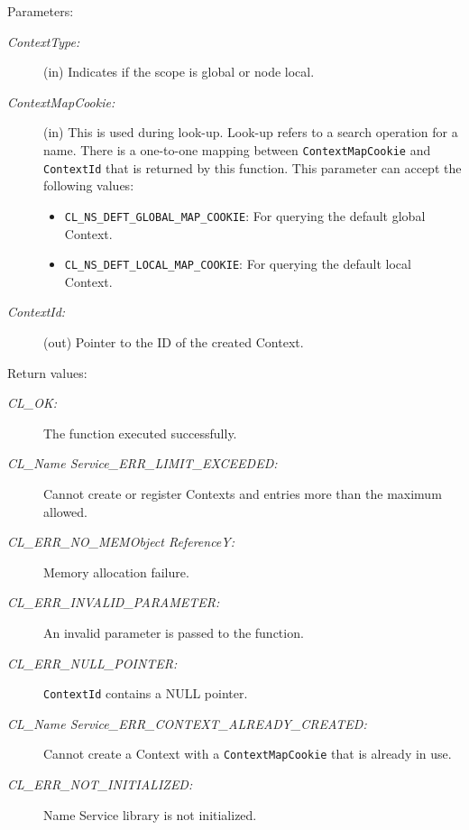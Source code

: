 \begin{flushleft}
\begin{Desc}
\begin{verbatim}
\end{verbatim}
\normalsize
\end{Desc}
\begin{Desc}
\item[Parameters:]
\begin{description}
\item[{\em Context\-Type:}](in) Indicates if the scope is global or node local. 
\item[{\em Context\-Map\-Cookie:}](in) This is used during look-up. Look-up refers to a search operation for a name. There is a one-to-one mapping 
between {\tt{ContextMapCookie}} and {\tt{ContextId}} that is returned by this function.
This parameter can 
accept the following values: 
\begin{itemize}
\item
{\tt{CL\_\-NS\_\-DEFT\_\-GLOBAL\_\-MAP\_\-COOKIE}}: For querying the default global Context. 
\item
{\tt{CL\_\-NS\_\-DEFT\_\-LOCAL\_\-MAP\_\-COOKIE}}: For querying the default local Context.  
\end{itemize}
\item[{\em Context\-Id:}](out) Pointer to the ID of the created Context.\end{description}
\end{Desc}
\begin{Desc}
\item[Return values:]
\begin{description}
\item[{\em CL\_\-OK:}]The function executed successfully. 
\item[{\em CL\_\-Name Service\_\-ERR\_\-LIMIT\_\-EXCEEDED:}]Cannot create or register Contexts and entries more than the maximum allowed.
\item[{\em CL\_\-ERR\_\-NO\_\-MEMObject ReferenceY:}]Memory allocation failure. 
\item[{\em CL\_\-ERR\_\-INVALID\_\-PARAMETER:}]An invalid parameter is passed to the function. 
\item[{\em CL\_\-ERR\_\-NULL\_\-POINTER:}]{\tt{ContextId}}  contains a NULL pointer. 
\item[{\em CL\_\-Name Service\_\-ERR\_\-CONTEXT\_\-ALREADY\_\-CREATED:}]Cannot create a Context with a {\tt{ContextMapCookie}} that is already in use.
\item[{\em CL\_\-ERR\_\-NOT\_\-INITIALIZED:}]Name Service library is not initialized.\end{description}
\end{Desc}

\end{flushleft}
